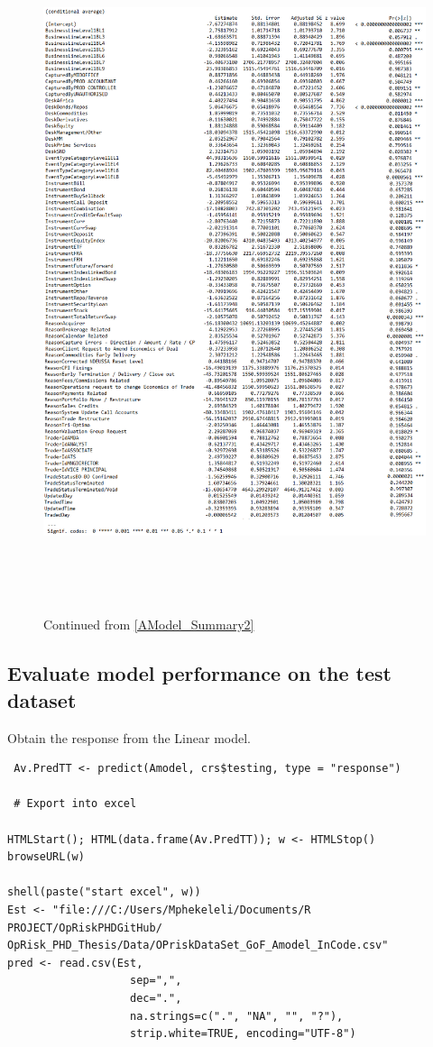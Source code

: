 \documentclass{DissertateUSU}
\begin{document}
\begin{figure}
\centering
\includegraphics[height=20cm, width=15cm]{Get_models_bin3.eps}
\caption[Model averaging]{Continued from \ref{AModel_Summary2}}
\label{AModel_Summary3}
\end{figure}

\subsection{Evaluate model performance on the test dataset}
\label{sec:Evaluate model performance on the test dataset}

Obtain the response from the Linear model.

\small

\begin{verbatim}
 Av.PredTT <- predict(Amodel, crs$testing, type = "response")
 
 # Export into excel
 
HTMLStart(); HTML(data.frame(Av.PredTT)); w <- HTMLStop()
browseURL(w)
 
shell(paste("start excel", w))
Est <- "file:///C:/Users/Mphekeleli/Documents/R PROJECT/OpRiskPHDGitHub/
OpRisk_PHD_Thesis/Data/OPriskDataSet_GoF_Amodel_InCode.csv"
pred <- read.csv(Est,
                   sep=",",
                   dec=".",
                   na.strings=c(".", "NA", "", "?"),
                   strip.white=TRUE, encoding="UTF-8")
\end{verbatim}
\end{document}
